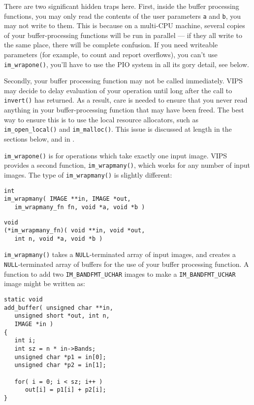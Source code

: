 There are two significant hidden traps here. First, inside the buffer
processing functions, you may only read the contents of the user parameters
\verb+a+ and \verb+b+, you may not write to them. This is because on a
multi-CPU machine, several copies of your buffer-processing functions will
be run in parallel --- if they all write to the same place, there will be
complete confusion. If you need writeable parameters (for example, to count
and report overflows), you can't use \verb+im_wrapone()+, you'll have to
use the PIO system in all its gory detail, see below.

Secondly, your buffer processing function may not be called immediately. VIPS
may decide to delay evaluation of your operation until long after the call
to \verb+invert()+ has returned. As a result, care is needed to ensure
that you never read anything in your buffer-processing function that may
have been freed. The best way to ensure this is to use the local resource
allocators, such as \verb+im_open_local()+ and \verb+im_malloc()+. This issue
is discussed at length in the sections below, and in .

\verb+im_wrapone()+ is for operations which take exactly one input image. VIPS
provides a second function, \verb+im_wrapmany()+, which works for any number
of input images. The type of \verb+im_wrapmany()+ is slightly different:

\begin{verbatim}
int
im_wrapmany( IMAGE **in, IMAGE *out,
   im_wrapmany_fn fn, void *a, void *b ) 
\end{verbatim}

\noindent

\begin{verbatim}
void 
(*im_wrapmany_fn)( void **in, void *out, 
   int n, void *a, void *b )
\end{verbatim}

\noindent
\verb+im_wrapmany()+ takes a \verb+NULL+-terminated array of input images,
and creates a \verb+NULL+-terminated array of buffers for the use of your
buffer processing function. A function to add two \verb+IM_BANDFMT_UCHAR+
images to make a \verb+IM_BANDFMT_UCHAR+ image might be written as:

\begin{verbatim}
static void
add_buffer( unsigned char **in, 
   unsigned short *out, int n, 
   IMAGE *in )
{
   int i;
   int sz = n * in->Bands;
   unsigned char *p1 = in[0];
   unsigned char *p2 = in[1];

   for( i = 0; i < sz; i++ )
      out[i] = p1[i] + p2[i];
} 
\end{verbatim}

